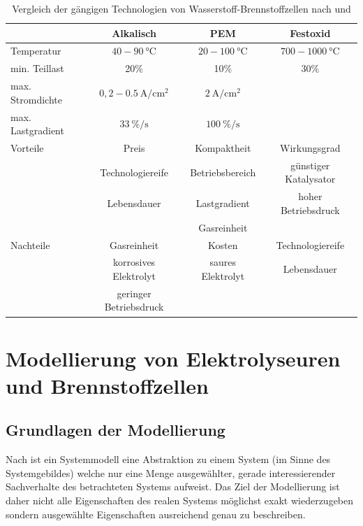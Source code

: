 \begin{table}[ht]
		\centering
		\caption{Vergleich der gängigen Technologien von Wasserstoff-Brennstoffzellen nach \citet{milanzi_technischer_2018} und \citet{rashid_hydrogen_2015} }
		\begin{tabular}{l c c c}
		\toprule
		 & Alkalisch & PEM & Festoxid
		\\
		\midrule
		Temperatur & $40 - \SI{90}{\degreeCelsius}$ & $20 - \SI{100}{\degreeCelsius}$ & $700-\SI{1000}{\degreeCelsius}$\\
		min. Teillast & 20\% & 10\% & 30\% \\
		max. Stromdichte & $0,2 - \SI{0,5}{\A\per\cm\squared}$ & $\SI{2}{\A\per\cm\squared}$ &\\
		max. Lastgradient & $\SI{33}{\%\per\s}$ & $\SI{100}{\%\per\s}$ & \\
		\midrule
		Vorteile & Preis & Kompaktheit & Wirkungsgrad\\
		& Technologiereife & Betriebsbereich & günstiger Katalysator\\
		& Lebensdauer & Lastgradient & hoher Betriebsdruck\\
		& & Gasreinheit&\\
		\midrule
		Nachteile & Gasreinheit & Kosten & Technologiereife\\
		& korrosives Elektrolyt & saures Elektrolyt & Lebensdauer\\
		& geringer Betriebsdruck & & \\
		\bottomrule
		\end{tabular}
		\label{tb:VglElektrolyseur}
		\end{table}	


\section{Modellierung von Elektrolyseuren und Brennstoffzellen}

\subsection{Grundlagen der Modellierung}
Nach \citet[S.~32]{tabeling_softwaresysteme_2006} ist ein Systemmodell eine Abstraktion zu einem System (im Sinne des Systemgebildes) welche nur eine Menge ausgewählter, gerade interessierender Sachverhalte des betrachteten Systems aufweist. Das Ziel der Modellierung ist daher nicht alle Eigenschaften des realen Systems möglichst exakt wiederzugeben sondern ausgewählte Eigenschaften ausreichend genau zu beschreiben.\\

